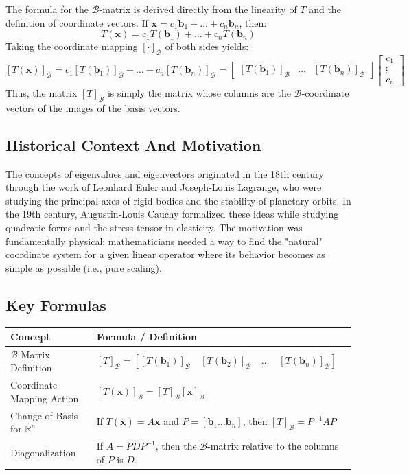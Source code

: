 \documentclass[11pt, a4paper]{article}
\theoremstyle{definition}
\theoremstyle{remark}
\newcommand{\R}{\mathbb{R}}
\begin{document}
The formula for the $\mathcal{B}$-matrix is derived directly from the linearity of $T$ and the definition of coordinate vectors. If $\mathbf{x} = c_1\mathbf{b}_1 + \dots + c_n\mathbf{b}_n$, then:
\[
T(\mathbf{x}) = c_1T(\mathbf{b}_1) + \dots + c_nT(\mathbf{b}_n)
\]
Taking the coordinate mapping $[\cdot]_\mathcal{B}$ of both sides yields:
\[
[T(\mathbf{x})]_\mathcal{B} = c_1[T(\mathbf{b}_1)]_\mathcal{B} + \dots + c_n[T(\mathbf{b}_n)]_\mathcal{B} = \begin{bmatrix} [T(\mathbf{b}_1)]_\mathcal{B} & \dots & [T(\mathbf{b}_n)]_\mathcal{B} \end{bmatrix} \begin{bmatrix} c_1 \\ \vdots \\ c_n \end{bmatrix}
\]
Thus, the matrix $[T]_\mathcal{B}$ is simply the matrix whose columns are the $\mathcal{B}$-coordinate vectors of the images of the basis vectors.

\subsection{Historical Context And Motivation}
The concepts of eigenvalues and eigenvectors originated in the 18th century through the work of Leonhard Euler and Joseph-Louis Lagrange, who were studying the principal axes of rigid bodies and the stability of planetary orbits. In the 19th century, Augustin-Louis Cauchy formalized these ideas while studying quadratic forms and the stress tensor in elasticity. The motivation was fundamentally physical: mathematicians needed a way to find the "natural" coordinate system for a given linear operator where its behavior becomes as simple as possible (i.e., pure scaling).

\subsection{Key Formulas}
\renewcommand{\arraystretch}{1.5}
\begin{tabularx}{\textwidth}{l X}
\toprule
\textbf{Concept} & \textbf{Formula / Definition} \\
\midrule
$\mathcal{B}$-Matrix Definition & $\displaystyle [T]_\mathcal{B} = \left[ [T(\mathbf{b}_1)]_\mathcal{B} \quad [T(\mathbf{b}_2)]_\mathcal{B} \quad \dots \quad [T(\mathbf{b}_n)]_\mathcal{B} \right]$ \\
\addlinespace[4pt]
Coordinate Mapping Action & $\displaystyle [T(\mathbf{x})]_\mathcal{B} = [T]_\mathcal{B} [\mathbf{x}]_\mathcal{B}$ \\
\addlinespace[4pt]
Change of Basis for $\R^n$ & If $T(\mathbf{x}) = A\mathbf{x}$ and $P = [\mathbf{b}_1 \dots \mathbf{b}_n]$, then $\displaystyle [T]_\mathcal{B} = P^{-1}AP$ \\
\addlinespace[4pt]
Diagonalization & If $A = PDP^{-1}$, then the $\mathcal{B}$-matrix relative to the columns of $P$ is $D$. \\
\bottomrule
\end{tabularx}
\end{document}
